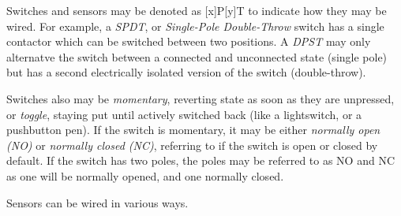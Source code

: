 Switches and sensors may be denoted as [x]P[y]T to indicate how they may be wired. For example, a \textit{SPDT}, or \textit{Single-Pole Double-Throw} switch has a single contactor which can be switched between two positions. A \textit{DPST} may only alternatve the switch between a connected and unconnected state (single pole) but has a second electrically isolated version of the switch (double-throw).

Switches also may be \textit{momentary}, reverting state as soon as they are unpressed, or \textit{toggle}, staying put until actively switched back (like a lightswitch, or a pushbutton pen). If the switch is momentary, it may be either \textit{normally open (NO)} or \textit{normally closed (NC)}, referring to if the switch is open or closed by default. If the switch has two poles, the poles may be referred to as NO and NC as one will be normally opened, and one normally closed.

Sensors can be wired in various ways.

